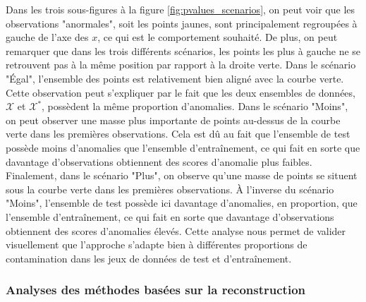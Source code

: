 Dans les trois sous-figures à la figure \ref{fig:pvalues_scenarios}, on peut voir que les observations "anormales", soit les points jaunes, sont principalement regroupées à gauche de l'axe des $x$, ce qui est le comportement souhaité. De plus, on peut remarquer que dans les trois différents scénarios, les points les plus à gauche ne se retrouvent pas à la même position par rapport à la droite verte. Dans le scénario "Égal", l'ensemble des points est relativement bien aligné avec la courbe verte. Cette observation peut s'expliquer par le fait que les deux ensembles de données, $\mathcal{X}$ et $\mathcal{X^*}$, possèdent la même proportion d'anomalies. Dans le scénario "Moins", on peut observer une masse plus importante de points au-dessus de la courbe verte dans les premières observations. Cela est dû au fait que l'ensemble de test possède moins d'anomalies que l'ensemble d'entraînement, ce qui fait en sorte que davantage d'observations obtiennent des scores d'anomalie plus faibles. Finalement, dans le scénario "Plus", on observe qu'une masse de points se situent sous la courbe verte dans les premières observations. À l'inverse du scénario "Moins", l'ensemble de test possède ici davantage d'anomalies, en proportion, que l'ensemble d'entraînement, ce qui fait en sorte que davantage d'observations obtiennent des scores d'anomalies élevés. Cette analyse nous permet de valider visuellement que l'approche s'adapte bien à différentes proportions de contamination dans les jeux de données de test et d'entraînement.

\subsubsection{Analyses des méthodes basées sur la reconstruction} \label{imagenet:reconsruction}

